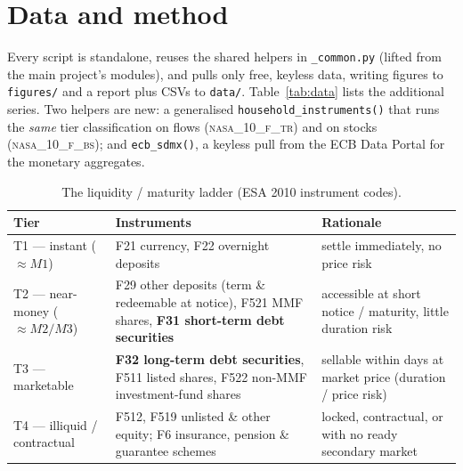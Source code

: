 \documentclass[11pt,a4paper]{article}
\newcommand{\code}[1]{\texttt{#1}}
\newcommand{\dataset}[1]{\textsc{#1}}
\begin{document}
\section{Data and method}\label{sec:data}

Every script is standalone, reuses the shared helpers in \code{\_common.py}
(lifted from the main project's modules), and pulls only free, keyless data,
writing figures to \code{figures/} and a report plus CSVs to \code{data/}.
Table~\ref{tab:data} lists the additional series. Two helpers are new: a
generalised \code{household\_instruments()} that runs the \emph{same} tier
classification on flows (\dataset{nasa\_10\_f\_tr}) and on stocks
(\dataset{nasa\_10\_f\_bs}); and \code{ecb\_sdmx()}, a keyless pull from the ECB
Data Portal for the monetary aggregates.

\begin{table}[htbp]\centering\small
\caption{The liquidity / maturity ladder (ESA 2010 instrument codes).}
\label{tab:ladder}
\begin{tabular}{@{}p{3.4cm}p{5.4cm}p{6.0cm}@{}}
\toprule
\textbf{Tier} & \textbf{Instruments} & \textbf{Rationale} \\
\midrule
T1 --- instant ($\approx M1$) & F21 currency, F22 overnight deposits &
  settle immediately, no price risk \\
T2 --- near-money ($\approx M2/M3$) & F29 other deposits (term \& redeemable at
  notice), F521 MMF shares, \textbf{F31 short-term debt securities} &
  accessible at short notice / maturity, little duration risk \\
T3 --- marketable & \textbf{F32 long-term debt securities}, F511 listed shares,
  F522 non-MMF investment-fund shares &
  sellable within days at market price (duration / price risk) \\
T4 --- illiquid / contractual & F512, F519 unlisted \& other equity; F6
  insurance, pension \& guarantee schemes &
  locked, contractual, or with no ready secondary market \\
\bottomrule
\end{tabular}
\end{table}
\end{document}
